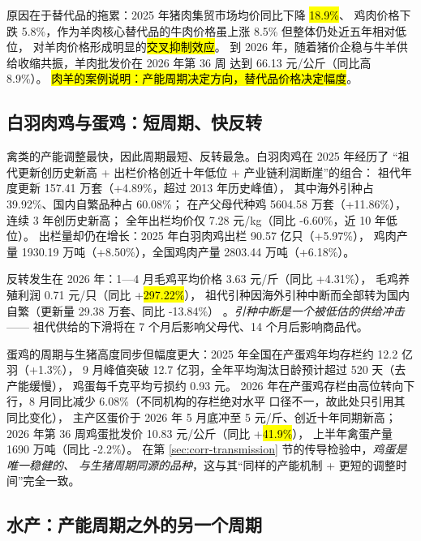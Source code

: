原因在于替代品的拖累：2025 年猪肉集贸市场均价同比下降 \hl{18.9\%}、
鸡肉价格下跌 5.8\%，作为羊肉核心替代品的牛肉价格虽上涨 8.5\% 但整体仍处近五年相对低位，
对羊肉价格形成明显的\hl{交叉抑制效应}\cite{lj2026mutton}。
到 2026 年，随着猪价企稳与牛羊供给收缩共振，羊肉批发价在 2026 年第 36 周
达到 66.13 元/公斤（同比高 8.9\%）\cite{xinhua2026week}。
\hl{肉羊的案例说明：产能周期决定方向，替代品价格决定幅度}。

\subsection{白羽肉鸡与蛋鸡：短周期、快反转}
\label{sec:other-poultry}

禽类的产能调整最快，因此周期最短、反转最急。白羽肉鸡在 2025 年经历了
“祖代更新创历史新高 + 出栏价格创近十年低位 + 产业链利润断崖”的组合：
祖代年度更新 157.41 万套（+4.89\%，超过 2013 年历史峰值），
其中海外引种占 39.92\%、国内自繁品种占 60.08\%；
在产父母代种鸡 5604.58 万套（+11.86\%），连续 3 年创历史新高；
全年出栏均价仅 7.28 元/kg（同比 -6.60\%，近 10 年低位）\cite{yangji2026chicken}。
出栏量却仍在增长：2025 年白羽肉鸡出栏 90.57 亿只（+5.97\%），
鸡肉产量 1930.19 万吨（+8.50\%），全国鸡肉产量 2803.44 万吨（+6.18\%）\cite{yangji2026chicken}。

反转发生在 2026 年：1---4 月毛鸡平均价格 3.63 元/斤（同比 +4.31\%），
毛鸡养殖利润 0.71 元/只（同比 +\hl{297.22\%}），
祖代引种因海外引种中断而全部转为国内自繁（更新量 29.38 万套、同比 -13.84\%）
\cite{yangji2026chicken}。\emph{引种中断是一个被低估的供给冲击}——
祖代供给的下滑将在 7 个月后影响父母代、14 个月后影响商品代。

蛋鸡的周期与生猪高度同步但幅度更大：2025 年全国在产蛋鸡年均存栏约 12.2 亿羽（+1.3\%），
9 月峰值突破 12.7 亿羽，全年平均淘汰日龄预计超过 520 天（去产能缓慢），
鸡蛋每千克平均亏损约 0.93 元\cite{aige2025layer}。
2026 年在产蛋鸡存栏由高位转向下行，8 月同比减少 \num{6.08}\%（不同机构的存栏绝对水平
口径不一，故此处只引用其同比变化）\cite{zhuochuang2026layer}，
主产区蛋价于 2026 年 5 月底冲至 5 元/斤、创近十年同期新高\cite{zhuochuang2026layer}；
2026 年第 36 周鸡蛋批发价 10.83 元/公斤（同比 +\hl{41.9\%}）\cite{xinhua2026week}，
上半年禽蛋产量 1690 万吨（同比 -2.2\%）\cite{stats2026h1}。
在第 \ref{sec:corr-transmission} 节的传导检验中，\emph{鸡蛋是唯一稳健的、
与生猪周期同源的品种}，这与其“同样的产能机制 + 更短的调整时间”完全一致。

\subsection{水产：产能周期之外的另一个周期}
\label{sec:other-aqua}

